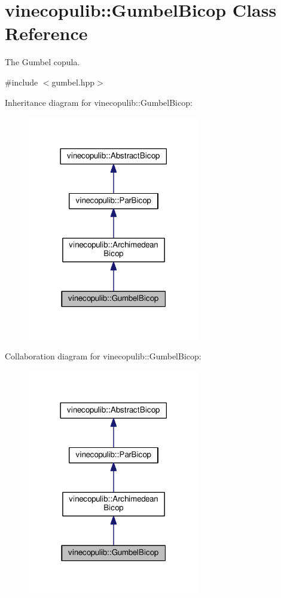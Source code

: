 \hypertarget{classvinecopulib_1_1_gumbel_bicop}{}\section{vinecopulib\+:\+:Gumbel\+Bicop Class Reference}
\label{classvinecopulib_1_1_gumbel_bicop}


The Gumbel copula.  




{\ttfamily \#include $<$gumbel.\+hpp$>$}



Inheritance diagram for vinecopulib\+:\+:Gumbel\+Bicop\+:
\nopagebreak
\begin{figure}[H]
\begin{center}
\leavevmode
\includegraphics[width=213pt]{classvinecopulib_1_1_gumbel_bicop__inherit__graph}
\end{center}
\end{figure}


Collaboration diagram for vinecopulib\+:\+:Gumbel\+Bicop\+:
\nopagebreak
\begin{figure}[H]
\begin{center}
\leavevmode
\includegraphics[width=213pt]{classvinecopulib_1_1_gumbel_bicop__coll__graph}
\end{center}
\end{figure}
